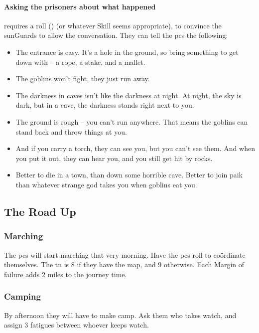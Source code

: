 \begin{multicols}{2}
\paragraph{Asking the prisoners about what happened}
requires a  roll (\tn[8]) (or whatever Skill seems appropriate), to convince the \glspl{sunGuard} to allow the conversation.
They can tell the \glspl{pc} the following:

\begin{itemize}
  \item
  The entrance is easy.
  It's a hole in the ground, so bring something to get down with -- a rope, a stake, and a mallet.
  \item
  The goblins won't fight, they just run away.
  \item
  The darkness in caves isn't like the darkness at night.
  At night, the sky is dark, but in a cave, the darkness stands right next to you.
  \item
  The ground is rough -- you can't run anywhere.
  That means the goblins can stand back and throw things at you.
  \item
  And if you carry a torch, they can see you, but you can't see them.
  And when you put it out, they can hear you, and you still get hit by rocks.
  \item
  Better to die in a town, than down some horrible cave.
  Better to join \gls{paik} than whatever strange god takes you when goblins eat you.
\end{itemize}

\redcoin

\subsection{The Road Up}

\subsubsection{Marching}
The \glspl{pc} will start marching that very morning.
Have the \glspl{pc} roll  to co\"{o}rdinate themselves.
The \gls{tn} is 8 if they have the map, and 9 otherwise.
Each Margin of failure adds 2 miles to the journey time.%

\subsubsection{Camping}
By afternoon they will have to make camp.
Ask them who takes watch, and assign 3 \glspl{fatigue} between whoever keeps watch.


\end{multicols}
